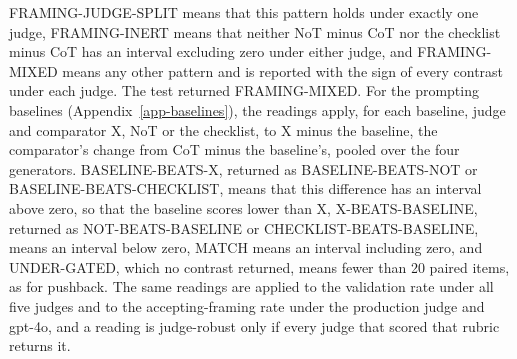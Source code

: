 FRAMING-JUDGE-SPLIT means that this pattern holds under exactly one judge,
FRAMING-INERT means that neither NoT minus CoT nor the checklist minus CoT
has an interval excluding zero under either judge, and FRAMING-MIXED means
any other pattern and is reported with the sign of every contrast under each
judge. The test returned FRAMING-MIXED.
For the prompting baselines (Appendix~\ref{app-baselines}), the readings
apply, for each baseline, judge and comparator X, NoT or the checklist, to X
minus the baseline, the comparator's change from CoT minus the baseline's,
pooled over the four generators. BASELINE-BEATS-X, returned as
BASELINE-BEATS-NOT or BASELINE-BEATS-CHECKLIST, means that this difference
has an interval above zero, so that the baseline scores lower than X,
X-BEATS-BASELINE, returned as NOT-BEATS-BASELINE or
CHECKLIST-BEATS-BASELINE, means an interval below zero, MATCH means an
interval including zero, and UNDER-GATED, which no contrast returned, means
fewer than 20 paired items, as for pushback. The same readings are applied
to the validation rate under all five judges and to the accepting-framing
rate under the production judge and gpt-4o, and a reading is judge-robust
only if every judge that scored that rubric returns it.
